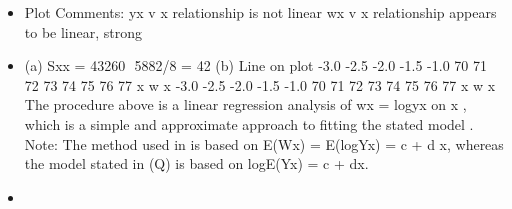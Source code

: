 \documentclass[a4paper,12pt]{article}
\begin{document}
\begin{itemize}
\item Plot
Comments: yx v x relationship is not linear
wx v x relationship appears to be linear, strong
\item (a) Sxx = 43260  5882/8 = 42
(b) Line on plot
-3.0
-2.5
-2.0
-1.5
-1.0
70 71 72 73 74 75 76 77
x
w x
-3.0
-2.5
-2.0
-1.5
-1.0
70 71 72 73 74 75 76 77
x
w x
The procedure above is a linear regression analysis of wx = logyx on x , which
is a simple and approximate approach to fitting the stated model .
Note: The method used in  is based on E(Wx) = E(logYx) = c + d x, whereas
the model stated in (Q) is based on logE(Yx) = c + dx.
    \item 
\end{itemize}
\end{document}

